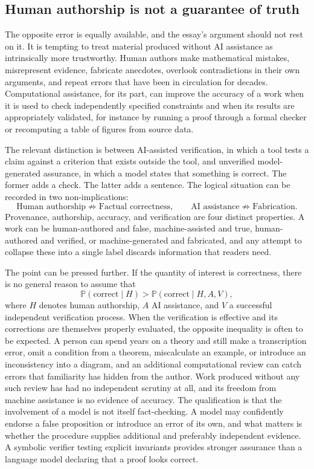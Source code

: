 \documentclass[12pt]{article}
\theoremstyle{plain}
\theoremstyle{definition}
\theoremstyle{remark}
\renewcommand{\Pr}{\mathbb{P}}
\begin{document}
\subsection{Human authorship is not a guarantee of truth}

The opposite error is equally available, and the essay's argument should not rest on it. It is tempting to treat material produced without AI assistance as intrinsically more trustworthy. Human authors make mathematical mistakes, misrepresent evidence, fabricate anecdotes, overlook contradictions in their own arguments, and repeat errors that have been in circulation for decades. Computational assistance, for its part, can improve the accuracy of a work when it is used to check independently specified constraints and when its results are appropriately validated, for instance by running a proof through a formal checker or recomputing a table of figures from source data.

The relevant distinction is between AI-assisted verification, in which a tool tests a claim against a criterion that exists outside the tool, and unverified model-generated assurance, in which a model states that something is correct. The former adds a check. The latter adds a sentence. The logical situation can be recorded in two non-implications:
\[
\text{Human authorship} \not\Rightarrow \text{Factual correctness},
\qquad
\text{AI assistance} \not\Rightarrow \text{Fabrication}.
\]
Provenance, authorship, accuracy, and verification are four distinct properties. A work can be human-authored and false, machine-assisted and true, human-authored and verified, or machine-generated and fabricated, and any attempt to collapse these into a single label discards information that readers need.

The point can be pressed further. If the quantity of interest is correctness, there is no general reason to assume that
\[
\Pr(\text{correct} \mid H) > \Pr(\text{correct} \mid H, A, V),
\]
where $H$ denotes human authorship, $A$ AI assistance, and $V$ a successful independent verification process. When the verification is effective and its corrections are themselves properly evaluated, the opposite inequality is often to be expected. A person can spend years on a theory and still make a transcription error, omit a condition from a theorem, miscalculate an example, or introduce an inconsistency into a diagram, and an additional computational review can catch errors that familiarity has hidden from the author. Work produced without any such review has had no independent scrutiny at all, and its freedom from machine assistance is no evidence of accuracy. The qualification is that the involvement of a model is not itself fact-checking. A model may confidently endorse a false proposition or introduce an error of its own, and what matters is whether the procedure supplies additional and preferably independent evidence. A symbolic verifier testing explicit invariants provides stronger assurance than a language model declaring that a proof looks correct.
\end{document}
